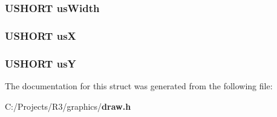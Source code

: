 \subsubsection[{usWidth}]{\setlength{\rightskip}{0pt plus 5cm}USHORT {\bf usWidth}}\label{struct_d_r_a_w___b_i_t_m_a_p___s_t_r_u_c_t_a8ed0f2aa3e23377fc6b0b73a4f5e68c7}
\subsubsection[{usX}]{\setlength{\rightskip}{0pt plus 5cm}USHORT {\bf usX}}\label{struct_d_r_a_w___b_i_t_m_a_p___s_t_r_u_c_t_a6ead387c0c38c4f3f98aac147733a602}
\subsubsection[{usY}]{\setlength{\rightskip}{0pt plus 5cm}USHORT {\bf usY}}\label{struct_d_r_a_w___b_i_t_m_a_p___s_t_r_u_c_t_aeb96aa8e26a2ce680ec0e55e40f33a44}


The documentation for this struct was generated from the following file:\begin{DoxyCompactItemize}
\item 
C:/Projects/R3/graphics/{\bf draw.h}\end{DoxyCompactItemize}
